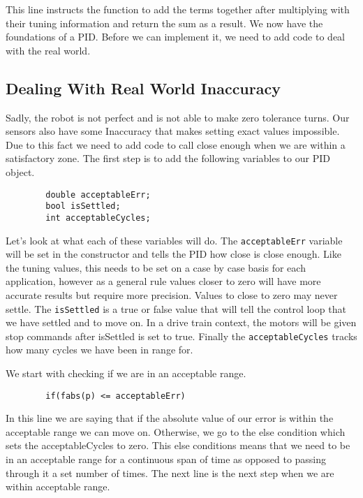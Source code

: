 \documentclass[12pt]{article}
\begin{document}
    This line instructs the function to add the terms together after multiplying with their tuning information and return the sum as a result. We now have the foundations of a PID. Before we can implement it, we need to add code to deal with the real world.

\subsection{Dealing With Real World Inaccuracy}
    Sadly, the robot is not perfect and is not able to make zero tolerance turns. Our sensors also have some Inaccuracy that makes setting exact values impossible. Due to this fact we need to add code to call close enough when we are within a satisfactory zone. The first step is to add the following variables to our PID object.

    \begin{verbatim}
        double acceptableErr;
        bool isSettled;
        int acceptableCycles;
    \end{verbatim}

    Let's look at what each of these variables will do. The \verb|acceptableErr| variable will be set in the constructor and tells the PID how close is close enough. Like the tuning values, this needs to be set on a case by case basis for each application, however as a general rule values closer to zero will have more accurate results but require more precision. Values to close to zero may never settle. The \verb|isSettled| is a true or false value that will tell the control loop that we have settled and to move on. In a drive train context, the motors will be given stop commands after isSettled is set to true. Finally the \verb|acceptableCycles| tracks how many cycles we have been in range for.

    We start with checking if we are in an acceptable range.

    \begin{verbatim}
        if(fabs(p) <= acceptableErr)
    \end{verbatim}

    In this line we are saying that if the absolute value of our error is within the acceptable range we can move on. Otherwise, we go to the else condition which sets the acceptableCycles to zero. This else conditions means that we need to be in an acceptable range for a continuous span of time as opposed to passing through it a set number of times. The next line is the next step when we are within acceptable range.
\end{document}
